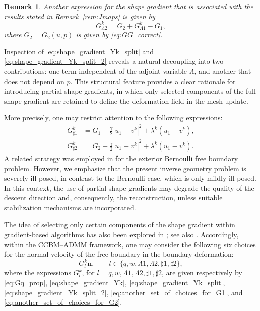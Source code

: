 \documentclass[a4paper,11pt]{article}
\newtheorem{remark}{Remark}
\newcommand{\vect}[1]{\boldsymbol{\mathbf{#1}}}
\newcommand{\ur}{u_{1}}
\newcommand{\GG}{G} %
\newcommand{\nn}{\vect{n}}
\newcommand{\ADMMpara}{\gamma}
\begin{document}
\begin{remark}
\label{prop:shape_gradient_Yk_separate}
Another expression for the shape gradient that is associated with the results stated in Remark~\ref{rem:Jmaps} is given by
\begin{equation}\label{eq:shape_gradient_Yk_split_2}
\GG^{k}_{\Lambda2} 
= \GG_2 + \GG^{k}_{\Lambda1}
-
\GG_{1},
\end{equation}
where $\GG_{2} = \GG_{2}(u, p)$ is given by \eqref{eq:GG_correct}.
\end{remark}
%
%
%

Inspection of \eqref{eq:shape_gradient_Yk_split} and \eqref{eq:shape_gradient_Yk_split_2} reveals a natural decoupling into two contributions: one term independent of the adjoint variable $\Lambda$, and another that does not depend on $p$. 
This structural feature provides a clear rationale for introducing partial shape gradients, in which only selected components of the full shape gradient are retained to define the deformation field in the mesh update.

More precisely, one may restrict attention to the following expressions:
%
\begin{align}
\GG^{k}_{\sharp1}
&=
\GG_{1}
+
\frac{\ADMMpara}{2}|\ur-v^{k}|^2
+
\lambda^{k}(\ur-v^{k})\label{eq:another_set_of_choices_for_G1},\\
%
\GG^{k}_{\sharp2}
&=
\GG_{2}
+
\frac{\ADMMpara}{2}|\ur-v^{k}|^2
+
\lambda^{k}(\ur-v^{k}).\label{eq:another_set_of_choices_for_G2}
\end{align}
A related strategy was employed in \cite{HIKKP2009} for the exterior Bernoulli free boundary problem. However, we emphasize that the present inverse geometry problem is severely ill-posed, in contrast to the Bernoulli case, which is only mildly ill-posed. 
In this context, the use of partial shape gradients may degrade the quality of the descent direction and, consequently, the reconstruction, unless suitable stabilization mechanisms are incorporated.

The idea of selecting only certain components of the shape gradient within gradient-based algorithms has also been explored in \cite{CherratAfraitesRabago2026}; see also \cite{RabagoKimura2025}. 
Accordingly, within the CCBM--ADMM framework, one may consider the following six choices for the normal velocity of the free boundary in the boundary deformation:
\[
	G_{l}^{k}\nn, \qquad l \in \{ q,w,\Lambda1, \Lambda2,\sharp1, \sharp2\},
\]
where the expressions $G_{l}^{k}$, for $l=q,w,\Lambda1, \Lambda2,\sharp1, \sharp2$, are given respectively by \eqref{eq:Gq_prop}, \eqref{eq:shape_gradient_Yk}, \eqref{eq:shape_gradient_Yk_split}, \eqref{eq:shape_gradient_Yk_split_2}, \eqref{eq:another_set_of_choices_for_G1}, and \eqref{eq:another_set_of_choices_for_G2}.
\end{document}

